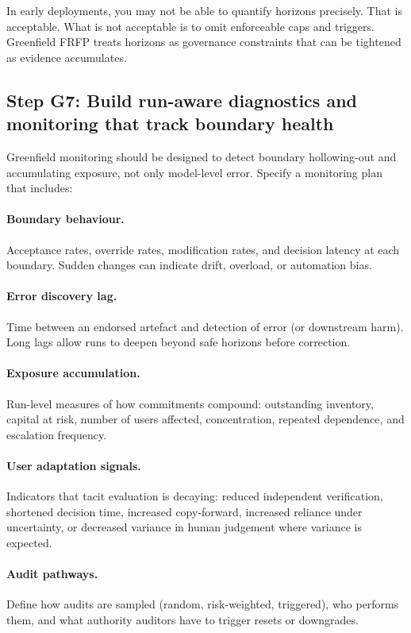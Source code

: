 In early deployments, you may not be able to quantify horizons precisely. That is acceptable. What is not acceptable is to omit enforceable caps and triggers. Greenfield FRFP treats horizons as governance constraints that can be tightened as evidence accumulates.

\subsection{Step G7: Build run-aware diagnostics and monitoring that track boundary health}

Greenfield monitoring should be designed to detect boundary hollowing-out and accumulating exposure, not only model-level error. Specify a monitoring plan that includes:

\paragraph{Boundary behaviour.}
Acceptance rates, override rates, modification rates, and decision latency at each boundary. Sudden changes can indicate drift, overload, or automation bias.

\paragraph{Error discovery lag.}
Time between an endorsed artefact and detection of error (or downstream harm). Long lags allow runs to deepen beyond safe horizons before correction.

\paragraph{Exposure accumulation.}
Run-level measures of how commitments compound: outstanding inventory, capital at risk, number of users affected, concentration, repeated dependence, and escalation frequency.

\paragraph{User adaptation signals.}
Indicators that tacit evaluation is decaying: reduced independent verification, shortened decision time, increased copy-forward, increased reliance under uncertainty, or decreased variance in human judgement where variance is expected.

\paragraph{Audit pathways.}
Define how audits are sampled (random, risk-weighted, triggered), who performs them, and what authority auditors have to trigger resets or downgrades.

